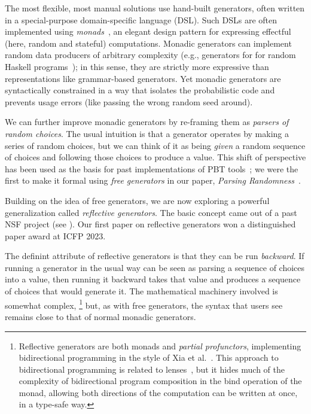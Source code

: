The most flexible, most manual solutions use hand-built
generators, often written in a special-purpose domain-specific language (DSL).
Such DSLs are often implemented using {\em
monads\/}~\cite{moggi1991notions}, an elegant design pattern for
expressing effectful (here, random and stateful) computations. Monadic
generators can implement random data producers of arbitrary complexity
(e.g., generators for for random Haskell
programs~\cite{palka_testing_2011}); in this sense, they are strictly more expressive than
representations like grammar-based generators.  Yet monadic generators are
syntactically constrained in a way that isolates the probabilistic code and
prevents usage errors (like passing the wrong random seed around).

We can further improve monadic generators by re-framing them as {\em
  parsers of random choices}.  The usual intuition is that a generator
operates by making a series of random choices, but we can think of
it as being {\em given} a random sequence of choices and following
those choices to produce a value. This shift of perspective has been
used as the basis for past implementations of PBT
tools~\cite{maciver2019hypothesis, dolan2017testing}; we were the
first to make it
formal using {\em free generators}
in our paper, {\em Parsing Randomness}~\cite{goldstein2022parsing}.


 Building on the
idea of free generators, we are now exploring a powerful
generalization called {\em reflective
  generators}.  The basic concept came out of a
past NSF project (see ). Our first paper on
reflective generators won a distinguished paper award at ICFP 2023. 

The definint attribute of reflective generators is that they can be run
{\em backward}.
If running a generator in the usual way can be seen as parsing a
sequence of choices into a
value, then running it backward takes that value and produces a
sequence of choices that
would generate it.
The mathematical machinery
involved is somewhat complex,%
\footnote{\normalsize Reflective generators are both monads and {\em
    partial profunctors},
implementing bidirectional programming in the style of Xia et
al.~\cite{xia2019composing}. This approach to bidirectional programming is
related to lenses~\cite{foster2009bidirectional}, but it hides much of the
complexity of bidirectional program composition in the bind operation of the
monad, allowing both directions of
the computation can be written at once, in a type-safe way.}
but, as with free generators, the syntax that users see remains close to
that of normal monadic generators.

